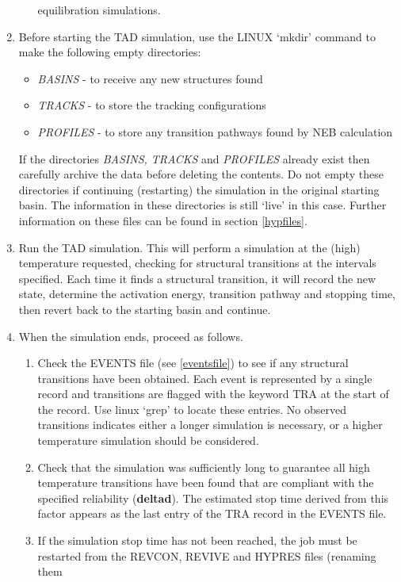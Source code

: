 \begin{enumerate}
\begin{enumerate}
  equilibration simulations.
\end{enumerate}
\item Before starting the TAD simulation, use the LINUX `mkdir' command to
   make the following empty directories: 
\begin{itemize}
   \item {\em BASINS} - to receive any new structures found
   \item {\em TRACKS} - to store the tracking configurations
   \item {\em PROFILES} - to store any transition pathways found by NEB calculation
\end{itemize}
   If the directories {\em BASINS, TRACKS} and {\em PROFILES} already
   exist then carefully archive the data before deleting the
   contents. Do not empty these directories if continuing (restarting)
   the simulation in the original starting basin. The information in
   these directories is still `live' in this case. Further information
   on these files can be found in section \ref{hypfiles}.
\item Run the TAD simulation. This will perform a simulation at the
  (high) temperature requested, checking for structural transitions at
  the intervals specified. Each time it finds a structural
  transition, it will record the new state, determine the activation
  energy, transition pathway and stopping time, then revert back to
  the starting basin and continue.
\item When the simulation ends, proceed as follows.
\begin{enumerate}
\item Check the EVENTS file (see \ref{eventsfile}) to see if any structural transitions
  have been obtained. Each event is represented by a single record and
  transitions are flagged with the keyword TRA at the start of
  the record. Use linux `grep' to locate these entries. No observed
  transitions indicates either a longer simulation is necessary, or
  a higher temperature simulation should be considered.
\item Check that the simulation was sufficiently long to guarantee all
  high temperature transitions have been found that are compliant with
  the specified reliability ({\bf deltad}). The estimated stop time derived
  from this factor appears as the last entry of the TRA record in the
  EVENTS file.
\item If the simulation stop time has not been reached, the job must be
  restarted from the REVCON, REVIVE and HYPRES files (renaming them

\end{enumerate}
\end{enumerate}
